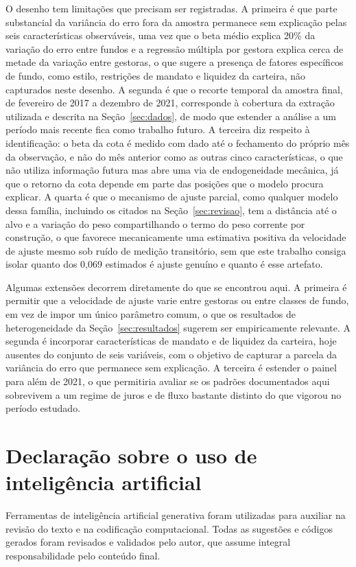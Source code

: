 \documentclass[12pt,a4paper]{article}
\begin{document}
O desenho tem limitações que precisam ser registradas. A primeira é que parte
substancial da variância do erro fora da amostra permanece sem explicação pelas seis características observáveis, uma vez que
o beta médio explica 20\% da variação do erro entre fundos e a regressão múltipla por gestora
explica cerca de metade da variação entre gestoras, o que sugere a presença de fatores
específicos de fundo, como estilo, restrições de mandato e liquidez da carteira, não
capturados neste desenho. A segunda é que o recorte temporal da amostra final, de fevereiro
de 2017 a dezembro de 2021, corresponde à cobertura da extração utilizada e descrita na
Seção~\ref{sec:dados}, de modo que estender a análise a um período mais recente fica como
trabalho futuro. A terceira diz respeito à identificação: o
beta da cota é medido com dado até o fechamento do próprio mês da observação, e não do mês
anterior como as outras cinco características, o que não utiliza informação futura mas abre
uma via de endogeneidade mecânica, já que o retorno da cota depende em parte das posições que
o modelo procura explicar. A quarta é que o mecanismo de ajuste parcial, como qualquer modelo
dessa família, incluindo os citados na Seção~\ref{sec:revisao}, tem a distância até o alvo e a
variação do peso compartilhando o termo do peso corrente por construção, o que favorece
mecanicamente uma estimativa positiva da velocidade de ajuste mesmo sob ruído de medição
transitório, sem que este trabalho consiga isolar quanto dos 0,069 estimados é ajuste genuíno
e quanto é esse artefato.

Algumas extensões decorrem diretamente do que se encontrou aqui. A primeira é permitir que
a velocidade de ajuste varie entre gestoras ou entre classes de fundo, em vez de impor um
único parâmetro comum, o que os resultados de heterogeneidade da
Seção~\ref{sec:resultados} sugerem ser empiricamente relevante. A segunda é
incorporar características de mandato e de liquidez da carteira, hoje ausentes do conjunto de
seis variáveis, com o objetivo de capturar a parcela da variância do erro que permanece sem
explicação. A terceira é estender o painel para além de 2021, o que permitiria avaliar se os
padrões documentados aqui sobrevivem a um regime de juros e de fluxo bastante distinto do que
vigorou no período estudado.

\section*{Declaração sobre o uso de inteligência artificial}

Ferramentas de inteligência artificial generativa foram utilizadas para auxiliar na revisão do
texto e na codificação computacional. Todas as sugestões e códigos gerados foram revisados e
validados pelo autor, que assume integral responsabilidade pelo conteúdo final.


\end{document}

